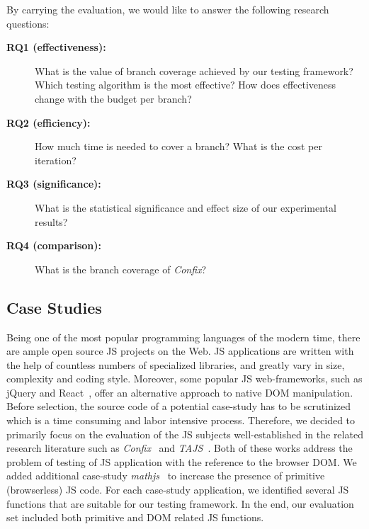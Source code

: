 \documentclass[sigconf,review]{acmart}
\begin{document}
By carrying the evaluation, we would like to answer the following research questions:
\begin{description}
\item[\textbf{RQ1 (effectiveness):}] What is the value of branch coverage achieved by our testing framework? Which testing algorithm is the most effective? How does effectiveness change with the budget per branch?
\item[\textbf{RQ2 (efficiency):}] How much time is needed to cover a branch? What is the cost per iteration?
\item[\textbf{RQ3 (significance):}] What is the statistical significance and effect size of our experimental results? 
\item[\textbf{RQ4 (comparison):}] What is the branch coverage of \emph{Confix}?
\end{description}


\subsection{Case Studies}
\label{sub.sec.case.studies}

Being one of the most popular programming languages of the modern time, there are ample open source JS projects on the Web. JS applications are written with the help of countless numbers of specialized libraries, and greatly vary in size, complexity and coding style. Moreover, some popular JS web-frameworks, such as jQuery and React~\cite{todomvc}, offer an alternative approach to native DOM manipulation. Before selection, the source code of a potential case-study has to be scrutinized which is a time consuming and labor intensive process. Therefore, we decided to primarily focus on the evaluation of the JS subjects well-established in the related research literature such as \emph{Confix}~\cite{amin:ase15} and \emph{TAJS}~\cite{dom2011, tajsbenchmarks}. Both of these works address the problem of testing of JS application with the reference to the browser DOM. We added additional case-study \emph{mathjs}~\cite{mathjs} to increase the presence of primitive (browserless) JS code. For each case-study application, we identified several JS functions that are suitable for our testing framework. In the end, our evaluation set included both primitive and DOM related JS functions.
\end{document}
